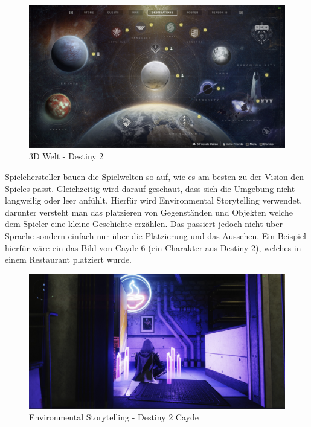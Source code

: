 
\begin{figure}
    \centering
    \includegraphics[scale=0.3]{pics/3d_welt_destiny_planets}
    \caption{3D Welt - Destiny 2}
    \label{fig:3d_environment_destiny2}
\end{figure}

Spielehersteller bauen die Spielwelten so auf, wie es am besten zu der Vision den Spieles passt.
Gleichzeitig wird darauf geschaut, dass sich die Umgebung nicht langweilig oder leer anfühlt.
Hierfür wird Environmental Storytelling verwendet, darunter versteht man das platzieren von Gegenständen und Objekten
welche dem Spieler eine kleine Geschichte erzählen.
Das passiert jedoch nicht über Sprache sondern einfach nur über die Platzierung und das Aussehen.
Ein Beispiel hierfür w\"are ein das Bild von Cayde-6 (ein Charakter aus Destiny 2), welches in einem Restaurant platziert wurde.
~\cite{GameDeveloper_2022}

\begin {figure}
    \includegraphics[scale=0.3]{pics/3d_welt_destiny2-environmental-storytelling}
    \caption{Environmental Storytelling - Destiny 2 Cayde}
    \label{fig:3d_environmental_storytelling_destiny2}
\end {figure}


